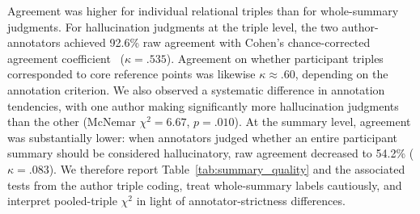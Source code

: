 \documentclass[manuscript,review,anonymous]{acmart}
\begin{document}
Agreement was higher for individual relational triples than for whole-summary judgments. For hallucination judgments at the triple level, the two author-annotators achieved 92.6\% raw agreement with Cohen's chance-corrected agreement coefficient~\cite{cohen1960coefficient} ($\kappa=.535$). Agreement on whether participant triples corresponded to core reference points was likewise $\kappa\approx.60$, depending on the annotation criterion. We also observed a systematic difference in annotation tendencies, with one author making significantly more hallucination judgments than the other (McNemar $\chi^2=6.67$, $p=.010$). At the summary level, agreement was substantially lower: when annotators judged whether an entire participant summary should be considered hallucinatory, raw agreement decreased to 54.2\% ($\kappa=.083$). We therefore report Table~\ref{tab:summary_quality} and the associated tests from the author triple coding, treat whole-summary labels cautiously, and interpret pooled-triple $\chi^2$ in light of annotator-strictness differences.







\end{document}
